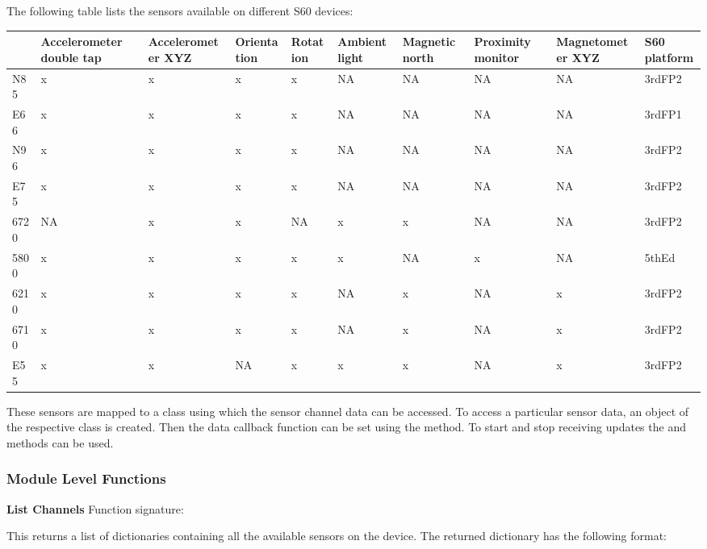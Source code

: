 The following table lists the sensors available on different S60 devices:
\begin{table}[htbp]
\small
\begin{center}
\begin{tabular}{l|p{18mm}|p{19mm}|l|l|p{1cm}|p{13mm}|p{15mm}|p{2cm}|p{15mm}}
\hline
& {\bf Accelerometer double tap} & {\bf Accelerometer XYZ} & {\bf Orientation} & {\bf Rotation} & {\bf Ambient light} & {\bf Magnetic north} & {\bf Proximity monitor} & {\bf Magnetometer XYZ} & {\bf S60 platform}  \\
\hline
N85 & x & x & x & x & NA & NA & NA & NA & 3rdFP2  \\
\hline
E66 & x & x & x & x & NA & NA & NA & NA & 3rdFP1  \\
\hline
N96 & x & x & x & x & NA & NA & NA & NA & 3rdFP2  \\
\hline
E75 & x & x & x & x & NA & NA & NA & NA & 3rdFP2  \\
\hline
6720 & NA & x & x & NA & x & x & NA & NA & 3rdFP2  \\
\hline
5800 & x & x & x & x & x & NA & x & NA & 5thEd  \\
\hline
6210 & x & x & x & x & NA & x & NA & x & 3rdFP2  \\
\hline
6710 & x & x & x & x & NA & x & NA & x & 3rdFP2  \\
\hline
E55 & x & x & NA & x & x & x & NA & x & 3rdFP2  \\
\end{tabular}
\end{center}
\end{table}

These sensors are mapped to a class using which the sensor channel data can be accessed. To access a particular sensor data, an object of the respective class is created. Then the data callback function can be set using the  method. To start and stop receiving updates the  and  methods can be used.

\subsubsection{Module Level Functions}

{\bf List Channels} \break
Function signature: 

This returns a list of dictionaries containing all the available sensors on the device. The returned dictionary has the following format:

